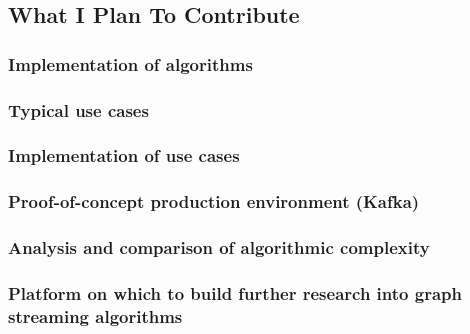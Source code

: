 \subsection{What I Plan To Contribute}

\subsubsection{Implementation of algorithms}
\subsubsection{Typical use cases}
\subsubsection{Implementation of use cases}
\subsubsection{Proof-of-concept production environment (Kafka)}
\subsubsection{Analysis and comparison of algorithmic complexity}
\subsubsection{Platform on which to build further research into graph streaming algorithms}
